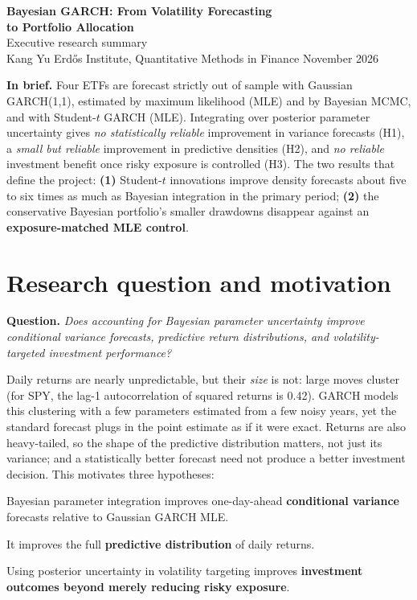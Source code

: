 \documentclass[11pt]{article}
\newcommand{\pbox}[1]{\par\smallskip\noindent\colorbox{boxbg}{\parbox{\dimexpr\textwidth-2\fboxsep}{#1}}\par\smallskip}
\begin{document}
\thispagestyle{fancy}
\begin{center}
{\LARGE\bfseries\color{navy} Bayesian GARCH: From Volatility Forecasting\\[2pt] to Portfolio Allocation}\\[6pt]
{\large Executive research summary}\\[4pt]
Kang Yu \;\textperiodcentered\; Erd\H{o}s Institute, Quantitative Methods in Finance \;\textperiodcentered\; November 2026
\end{center}

\pbox{\textbf{In brief.} Four ETFs are forecast strictly out of sample with Gaussian GARCH(1,1), estimated by maximum
likelihood (MLE) and by Bayesian MCMC, and with Student-$t$ GARCH (MLE). Integrating over posterior parameter
uncertainty gives \emph{no statistically reliable} improvement in variance forecasts (H1), a \emph{small but reliable}
improvement in predictive densities (H2), and \emph{no reliable} investment benefit once risky exposure is controlled
(H3). The two results that define the project: \textbf{(1)} Student-$t$ innovations improve density forecasts about five
to six times as much as Bayesian integration in the primary period; \textbf{(2)} the conservative Bayesian portfolio's
smaller drawdowns disappear against an \textbf{exposure-matched MLE control}.}

\section{Research question and motivation}
\textbf{Question.} \emph{Does accounting for Bayesian parameter uncertainty improve conditional variance forecasts,
predictive return distributions, and volatility-targeted investment performance?}

Daily returns are nearly unpredictable, but their \emph{size} is not: large moves cluster (for SPY, the lag-1
autocorrelation of squared returns is 0.42). GARCH \cite{engle1982,bollerslev1986} models this clustering with a few parameters estimated from a few
noisy years, yet the standard forecast plugs in the point estimate as if it were exact. Returns are also heavy-tailed,
so the shape of the predictive distribution matters, not just its variance; and a statistically better forecast need
not produce a better investment decision. This motivates three hypotheses:

\begin{description}[leftmargin=2.3em,style=sameline]
\item[H1] Bayesian parameter integration improves one-day-ahead \textbf{conditional variance} forecasts relative to Gaussian GARCH MLE.
\item[H2] It improves the full \textbf{predictive distribution} of daily returns.
\item[H3] Using posterior uncertainty in volatility targeting improves \textbf{investment outcomes beyond merely reducing risky exposure}.
\end{description}
\end{document}
